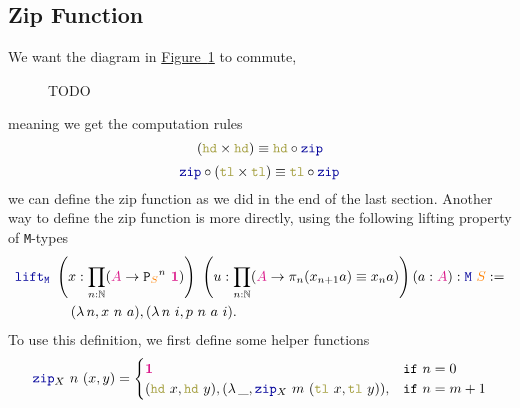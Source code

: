 \documentclass[twoside,11pt,openright]{report}
\theoremstyle{plain} %
\theoremstyle{definition}
\theoremstyle{remark}
\newcommand*{\figref}[1]{\hyperref[fig:#1]{Figure~\ref*{fig:#1}}}
\newcommand*{\type}[1]{\textcolor{magenta!90!black}{#1}}
\newcommand*{\container}[1]{\textcolor{orange}{#1}}
\newcommand*{\unit}{\type{\textbf{1}}}
\newcommand*{\function}[1]{\textcolor{blue!60!black}{\ensuremath{\mathtt{#1}}}}
\newcommand*{\destructor}[1]{\textcolor{yellow!60!black}{\ensuremath{\mathtt{#1}}}}
\newcommand*{\typeformer}[1]{\ensuremath{\mathtt{#1}}}
\newcommand*{\functor}[1]{\ensuremath{\mathbf{\mathtt{#1}}}}
\begin{document}
\subsection{Zip Function}
We want the diagram in \figref{zip-computation-rules} to commute,
\begin{figure}[h]
  \centering
  \caption{TODO}
  \label{fig:zip-computation-rules}
\end{figure}
meaning we get the computation rules
\begin{equation}
  (\destructor{hd} \times \destructor{hd}) \equiv \destructor{hd} \circ \function{zip}
\end{equation}
\begin{equation}
  \function{zip} \circ (\destructor{tl} \times \destructor{tl}) \equiv \destructor{tl} \circ \function{zip}
\end{equation}
we can define the zip function as we did in the end of the last section. Another way to define the zip function is more directly, using the following lifting property of \texttt{M}-types
\begin{equation}
  \begin{aligned}
    &\function{lift_M}~\left(x : \prod_{n : \mathbb{N}} (\type{A} \rightarrow {\functor{P}_{\container{S}}}^n~\unit)\right)~\left(u : \prod_{n : \mathbb{N}} (\type{A} \rightarrow \pi_n (x_{n+1} a) \equiv x_n a)\right) (a : \type{A}) : \function{M}~\container{S} := \\
    &\qquad\qquad (\lambda\,n, x~n~a) , (\lambda\,n~i, p~n~a~i).
  \end{aligned} \label{eq:M-lift}
\end{equation}
To use this definition, we first define some helper functions
\begin{equation}
  \function{zip}_{X}~n~(x , y) = \begin{cases} \unit & \mathtt{if}~n = 0 \\ (\destructor{hd}~x , \destructor{hd}~y) , (\lambda\,\_, \function{zip}_{X}~m~(\destructor{tl}~x,\destructor{tl}~y)) , & \mathtt{if}~n = m + 1 \end{cases}
\end{equation}
\end{document}
